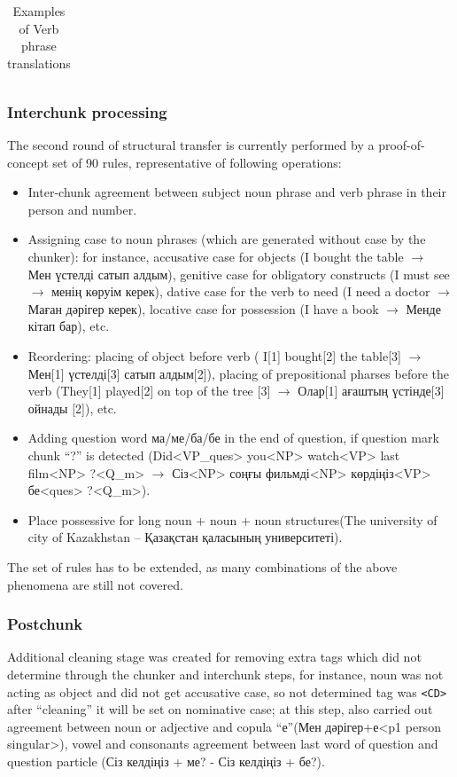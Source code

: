 \documentclass[11pt]{article}
\begin{document}
\begin{table}
\begin{tabular}{|l|l|l|l|}
     
  \end{tabular}
  \caption{Examples of Verb phrase translations}
  \label{table:vps}
\end{table}

\subsubsection{Interchunk processing}

The second round of structural transfer is currently performed by a proof-of-concept set of 90 rules, representative of following operations:
\begin{itemize}
\item Inter-chunk agreement between subject noun phrase and verb phrase in their person and number.
\item Assigning case to noun phrases (which are generated without case by the chunker): for instance, 
  accusative case for objects (I bought the table $\rightarrow$ Мен үстелді  сатып алдым), genitive case for 
  obligatory constructs (I must see $\rightarrow$ менің көруім керек),  dative case for the verb to 
  need (I need a doctor $\rightarrow$Маған дәрігер керек), locative case for 
  possession (I have a book $\rightarrow$ Менде кітап бар), etc.
\item Reordering: placing of object before verb ( I[1] bought[2] the table[3] $\rightarrow$ Мен[1] үстелді[3] сатып алдым[2]), 
  placing of prepositional pharses before the verb  (They[1] played[2] on top of the tree [3] $\rightarrow$ Олар[1] ағаштың үстінде[3] ойнады [2]), etc.
\item Adding question word ма/ме/ба/бе in the end of question, if question mark chunk ``?'' is detected (Did<VP\_ques> you<NP> watch<VP> last film<NP> ?<Q\_m> $\rightarrow$ Сіз<NP> соңғы фильмді<NP> көрдіңіз<VP> бе<ques> ?<Q\_m>).
\item Place possessive for long noun + noun + noun structures(The university of city of Kazakhstan -- Қазақстан қаласының университеті).
\end{itemize}

The set of rules has to be extended, as many combinations of the above phenomena are still not covered.

\subsubsection{Postchunk}

Additional cleaning stage was created for removing extra tags which did not determine through the chunker and 
interchunk steps, for instance, noun was not acting as object and did not get accusative case, so not determined 
tag was \texttt{<CD>} after ``cleaning'' it will be set on nominative case; at this step, also carried out 
agreement between noun or adjective and copula ``е''(Мен дәрігер+е<p1 person singular>), vowel and consonants 
agreement between last word of question and question particle (Сіз келдіңіз + ме? - Сіз келдіңіз + бе?).
\end{document}
